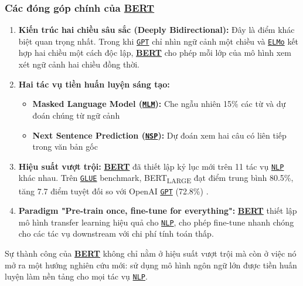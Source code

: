     \subsubsection{Các đóng góp chính của \hyperref[acro:bert]{\textbf{BERT}}}
    \begin{enumerate}
        \item \textbf{Kiến trúc hai chiều sâu sắc (Deeply Bidirectional):} Đây là điểm khác biệt quan trọng nhất. Trong khi \hyperref[acro:gpt]{\texttt{GPT}} chỉ nhìn ngữ cảnh một chiều và \hyperref[acro:elmo]{\texttt{ELMo}} kết hợp hai chiều một cách độc lập, \hyperref[acro:bert]{\textbf{BERT}} cho phép mỗi lớp của mô hình xem xét ngữ cảnh hai chiều đồng thời.
        
        \item \textbf{Hai tác vụ tiền huấn luyện sáng tạo:}
        \begin{itemize}
            \item \textbf{Masked Language Model (\hyperref[acro:mlm]{\texttt{MLM}}):} Che ngẫu nhiên 15\% các từ và dự đoán chúng từ ngữ cảnh
            \item \textbf{Next Sentence Prediction (\hyperref[acro:nsp]{\texttt{NSP}}):} Dự đoán xem hai câu có liên tiếp trong văn bản gốc
        \end{itemize}
        
        \item \textbf{Hiệu suất vượt trội:} \hyperref[acro:bert]{\textbf{BERT}} đã thiết lập kỷ lục mới trên 11 tác vụ \hyperref[acro:nlp]{\texttt{NLP}} khác nhau. Trên \hyperref[acro:glue]{\texttt{GLUE}} benchmark, BERT\textsubscript{LARGE} đạt điểm trung bình 80.5\%, tăng 7.7 điểm tuyệt đối so với OpenAI \hyperref[acro:gpt]{\texttt{GPT}} (72.8\%) \cite{devlin2018bert}.
        
        \item \textbf{Paradigm "Pre-train once, fine-tune for everything":} \hyperref[acro:bert]{\textbf{BERT}} thiết lập mô hình transfer learning hiệu quả cho \hyperref[acro:nlp]{\texttt{NLP}}, cho phép fine-tune nhanh chóng cho các tác vụ downstream với chi phí tính toán thấp.
    \end{enumerate}
    
    Sự thành công của \hyperref[acro:bert]{\textbf{BERT}} không chỉ nằm ở hiệu suất vượt trội mà còn ở việc nó mở ra một hướng nghiên cứu mới: sử dụng mô hình ngôn ngữ lớn được tiền huấn luyện làm nền tảng cho mọi tác vụ \hyperref[acro:nlp]{\texttt{NLP}}.
    
